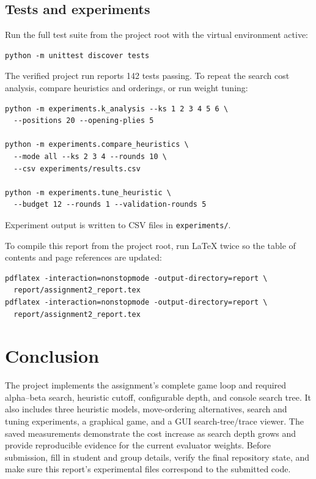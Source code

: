 \documentclass[11pt,a4paper]{article}
\begin{document}
\subsection{Tests and experiments}
Run the full test suite from the project root with the virtual environment
active:
\begin{lstlisting}
python -m unittest discover tests
\end{lstlisting}
The verified project run reports 142 tests passing. To repeat the search cost
analysis, compare heuristics and orderings, or run weight tuning:
\begin{lstlisting}
python -m experiments.k_analysis --ks 1 2 3 4 5 6 \
  --positions 20 --opening-plies 5

python -m experiments.compare_heuristics \
  --mode all --ks 2 3 4 --rounds 10 \
  --csv experiments/results.csv

python -m experiments.tune_heuristic \
  --budget 12 --rounds 1 --validation-rounds 5
\end{lstlisting}
Experiment output is written to CSV files in \texttt{experiments/}.

To compile this report from the project root, run LaTeX twice so the table of
contents and page references are updated:
\begin{lstlisting}
pdflatex -interaction=nonstopmode -output-directory=report \
  report/assignment2_report.tex
pdflatex -interaction=nonstopmode -output-directory=report \
  report/assignment2_report.tex
\end{lstlisting}

\section{Conclusion}

The project implements the assignment's complete game loop and required
alpha--beta search, heuristic cutoff, configurable depth, and console search
tree. It also includes three heuristic models, move-ordering alternatives,
search and tuning experiments, a graphical game, and a GUI search-tree/trace
viewer. The saved measurements demonstrate the cost increase as search depth
grows and provide reproducible evidence for the current evaluator weights.
Before submission, fill in student and group details, verify the final
repository state, and make sure this report's experimental files correspond to
the submitted code.

\appendix
\end{document}
